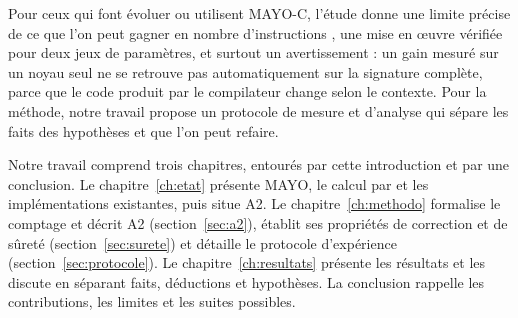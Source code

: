 Pour ceux qui font évoluer ou utilisent MAYO-C, l'étude donne une limite précise de ce que l'on peut gagner en nombre d'instructions \vpshufb{}, une mise en œuvre vérifiée pour deux jeux de paramètres, et surtout un avertissement : un gain mesuré sur un noyau seul ne se retrouve pas automatiquement sur la signature complète, parce que le code produit par le compilateur change selon le contexte. Pour la méthode, notre travail propose un protocole de mesure et d'analyse qui sépare les faits des hypothèses et que l'on peut refaire.

Notre travail comprend trois chapitres, entourés par cette introduction et par une conclusion. Le chapitre~\ref{ch:etat} présente MAYO, le calcul par \vpshufb{} et les implémentations existantes, puis situe A2. Le chapitre~\ref{ch:methodo} formalise le comptage et décrit A2 (section~\ref{sec:a2}), établit ses propriétés de correction et de sûreté (section~\ref{sec:surete}) et détaille le protocole d'expérience (section~\ref{sec:protocole}). Le chapitre~\ref{ch:resultats} présente les résultats et les discute en séparant faits, déductions et hypothèses. La conclusion rappelle les contributions, les limites et les suites possibles.
